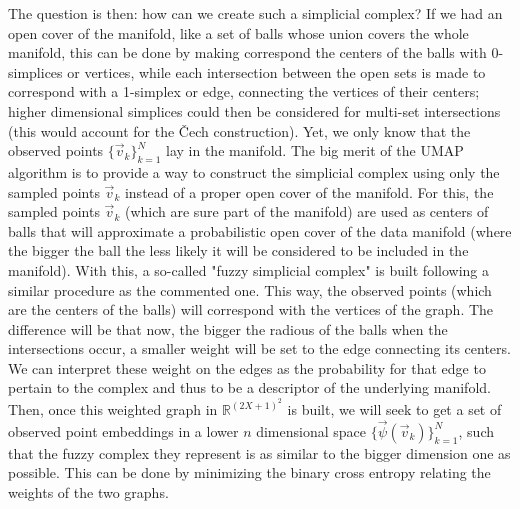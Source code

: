 \documentclass[11pt, a4paper, twoside]{article} %
\newcommand{\R}{\mathbb{R}} %
\DeclareRobustCommand{\mybox}[2][gray!10]{%
\begin{tcolorbox}[   %
        left=0.2cm,
        right=0.2cm,
        top=0.15cm,
        bottom=0.15cm,
        colback=#1,
        colframe=#1,
        width=\dimexpr\textwidth\relax, 
        enlarge left by=0mm,
        boxsep=5pt,
        arc=0pt,outer arc=0pt,
        ]
        #2
\end{tcolorbox}
}
\begin{document}
\mybox{The question is then: how can we create such a simplicial complex? If we had an open cover of the manifold, like a set of balls whose union covers the whole manifold, this can be done by making correspond the centers of the balls with 0-simplices or vertices, while each intersection between the open sets is made to correspond with a 1-simplex or edge, connecting the vertices of their centers; higher dimensional simplices could then be considered for multi-set intersections (this would account for the Čech construction). Yet, we only know that the observed points $\{\vec{v}_k\}_{k=1}^N$ lay in the manifold. The big merit of the UMAP algorithm \cite{umap} is to provide a way to construct the simplicial complex using only the sampled points $\vec{v}_k$ instead of a proper open cover of the manifold. For this, the sampled points $\vec{v}_k$ (which are sure part of the manifold) are used as centers of balls that will approximate a probabilistic open cover of the data manifold (where the bigger the ball the less likely it will be considered to be included in the manifold). With this, a so-called "fuzzy simplicial complex" is built following a similar procedure as the commented one. This way, the observed points (which are the centers of the balls) will correspond with the vertices of the graph. The difference will be that now, the bigger the radious of the balls when the intersections occur, a smaller weight will be set to the edge connecting its centers. We can interpret these weight on the edges as the probability for that edge to pertain to the complex and thus to be a descriptor of the underlying manifold. Then, once this weighted graph in $\R^{(2X+1)^2}$ is built, we will seek to get a set of observed point embeddings in a lower $n$ dimensional space $\{\vec{\psi}(\vec{v}_k)\}_{k=1}^N$, such that the fuzzy complex they represent is as similar to the bigger dimension one as possible. This can be done by minimizing the binary cross entropy relating the weights of the two graphs.\vspace{0.2cm}

}
\end{document}
